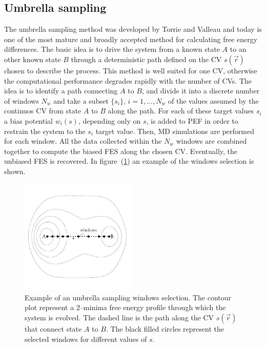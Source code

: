 \subsection{Umbrella sampling}
The umbrella sampling method was developed by Torrie and Valleau and today is one of the most mature and broadly 
accepted method for calculating free energy differences. The basic idea is to drive the system from a known state 
$A$ to an other known state $B$ through a deterministic path defined on the \ac{CV} $s(\vec r)$ chosen to 
describe the process. This method is well suited for one \ac{CV}, otherwise the computational performance 
degrades rapidly with the number of \acp{CV}. The idea is to identify a path connecting $A$ to $B$, and divide it 
into a discrete number of windows $N_w$ and take a subset $\{s_i\}$, $i=1,\dots,N_w$ of the values assumed by the 
continuos \ac{CV} from state $A$ to $B$ along the path. For each of these target values $s_i$ a bias potential 
$w_i(s)$, depending only on $s$, is added to \ac{PEF} in order to restrain the system to the $s_i$ target value. 
Then, \ac{MD} simulations are performed for each window. All the data collected within the $N_w$ windows are 
combined together to compute the biased \ac{FES} along the chosen \ac{CV}. Eventually, the unbiased \ac{FES} is 
recovered. In figure~(\ref{fig:umbrellaPath}) an example of the windows selection is shown.
\begin{figure}
	\centering
	\includegraphics[width=0.5\textwidth]{./img/umbrellaPath/umbrellaPath.pdf}
	\caption{Example of an umbrella sampling windows selection. The contour plot represent a $2$--minima free energy profile through which the system is evolved. The dashed line is the path along the \acs{CV} $s(\vec r)$ that connect state $A$ to $B$. The black filled circles represent the selected windows for different values of $s$.}
	\label{fig:umbrellaPath}
\end{figure}

